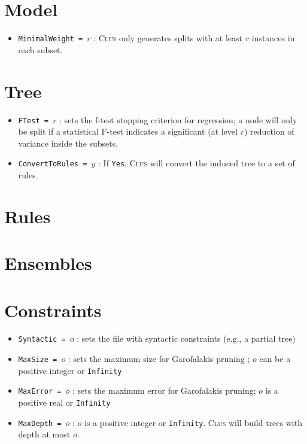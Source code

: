 \documentclass[a4paper]{report}
\newcommand{\clus}{\textsc{Clus}}
\begin{document}
\section{Model}

\begin{itemize}
\item {\tt MinimalWeight = $r$} : \clus{} only generates splits with at least $r$ instances in each subset.
\end{itemize}

\section{Tree}

\begin{itemize}
\item {\tt FTest = $r$} : sets the f-test stopping criterion for regression; a node will only be split if a statistical F-test indicates a significant (at level $r$) reduction of variance inside the subsets.
\item {\tt ConvertToRules = $y$} : If {\tt Yes},  \clus{} will convert the induced tree to a set of rules.
\end{itemize}

\section{Rules}


\section{Ensembles}

\section{Constraints}

\begin{itemize}
\item {\tt Syntactic = $o$} : sets the file with syntactic constraints (e.g., a partial tree) \cite{Struyf06-KDID:proc}
\item {\tt MaxSize = $o$} : sets the maximum size for Garofalakis pruning \cite{Garofalakis03:jrnl, Struyf06-KDID:proc}; $o$ can be a positive integer or {\tt Infinity}
\item {\tt MaxError = $o$} : sets the maximum error for Garofalakis pruning; $o$ is a positive real or {\tt Infinity}
\item {\tt MaxDepth = $o$} : $o$ is a positive integer or {\tt Infinity}. \clus{} will build trees with depth at most $o$.
\end{itemize}
\end{document}
